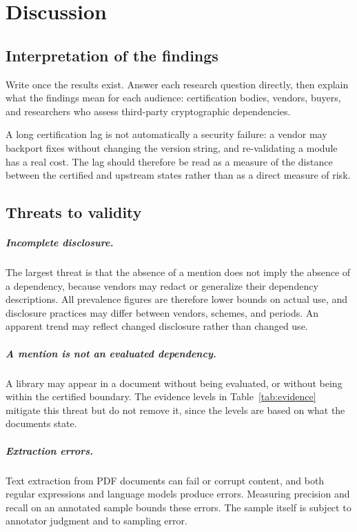 \chapter{Discussion}
\label{ch:discussion}

\section{Interpretation of the findings}
\label{sec:interpretation}

{Write once the results exist. Answer each research question directly, then
explain what the findings mean for each audience: certification bodies, vendors,
buyers, and researchers who assess third-party cryptographic dependencies.}

A long certification lag is not automatically a security failure: a vendor may
backport fixes without changing the version string, and re-validating a module has
a real cost. The lag should therefore be read as a measure of the distance between
the certified and upstream states rather than as a direct measure of risk.

\section{Threats to validity}
\label{sec:threats}

\paragraph{Incomplete disclosure.} The largest threat is that the absence of a mention
does not imply the absence of a dependency, because vendors may redact or generalize
their dependency descriptions. All prevalence figures are therefore lower bounds on
actual use, and disclosure practices may differ between vendors, schemes, and
periods. An apparent trend may reflect changed disclosure rather than changed use.

\paragraph{A mention is not an evaluated dependency.} A library may appear in a document
without being evaluated, or without being within the certified boundary. The evidence
levels in Table~\ref{tab:evidence} mitigate this threat but do not remove it, since the
levels are based on what the documents state.

\paragraph{Extraction errors.} Text extraction from PDF documents can fail or corrupt
content, and both regular expressions and language models produce errors. Measuring
precision and recall on an annotated sample bounds these errors. The sample itself is
subject to annotator judgment and to sampling error.

